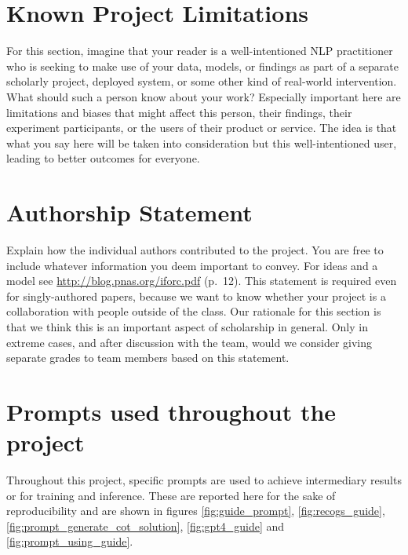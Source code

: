 \documentclass[11pt]{article}
\begin{document}
    \section*{Known Project Limitations}

    For this section, imagine that your reader is a well-intentioned NLP practitioner who is seeking to make use of your data, models, or findings as part of a separate scholarly project, deployed system, or some other kind of real-world intervention. What should such a person know about your work? Especially important here are limitations and biases that might affect this person, their findings, their experiment participants, or the users of their product or service. The idea is that what you say here will be taken into consideration but this well-intentioned user, leading to better outcomes for everyone.


    \section*{Authorship Statement}

    Explain how the individual authors contributed to the
    project. You are free to include whatever information you deem important to convey. For ideas and a model see \url{http://blog.pnas.org/iforc.pdf} (p.~12).
    This statement is required even for singly-authored papers, because we want to know whether your project is a collaboration with people outside of the class. Our rationale for this section is that we think this is an important aspect of scholarship in general. Only in extreme cases, and after discussion with the team, would we consider giving separate grades to team members based on this statement.

    

    \appendix


    \section{Prompts used throughout the project}\label{sec:appendix}
    Throughout this project, specific prompts are used to achieve intermediary results or for training and inference.
    These are reported here for the sake of reproducibility and are shown in figures \ref{fig:guide_prompt},
    \ref{fig:recogs_guide}, \ref{fig:prompt_generate_cot_solution}, \ref{fig:gpt4_guide} and \ref{fig:prompt_using_guide}.
\end{document}
